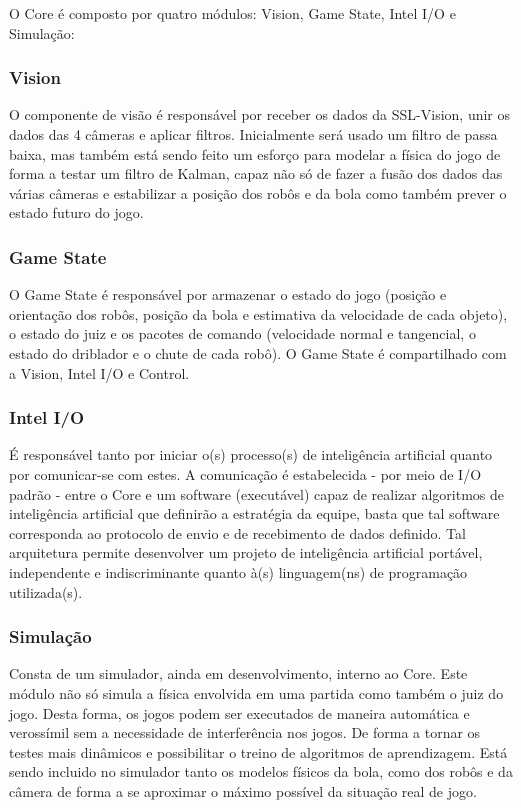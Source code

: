 \documentclass[conference]{IEEEtran}
\begin{document}
O Core é composto por quatro módulos: Vision, Game State, Intel I/O e Simulação:

\subsubsection{Vision}

O componente de visão é responsável por receber os dados da SSL-Vision, unir os dados das 4 câmeras e aplicar filtros. Inicialmente será usado um filtro de passa baixa, mas também está sendo feito um esforço para modelar a física do jogo de forma a testar um filtro de Kalman, capaz não só de fazer a fusão dos dados das várias câmeras e estabilizar a posição dos robôs e da bola como também prever o estado futuro do jogo.

\subsubsection{Game State}

O Game State é responsável por armazenar o estado do jogo (posição e orientação dos robôs, posição da bola e estimativa da velocidade de cada objeto), o estado do juiz e os pacotes de comando (velocidade normal e tangencial, o estado do driblador e o chute de cada robô). O Game State é compartilhado com a Vision, Intel I/O e Control.

\subsubsection{Intel I/O}

É responsável tanto por iniciar o(s) processo(s) de inteligência artificial quanto por comunicar-se com estes. A comunicação é estabelecida - por meio de I/O padrão - entre o Core e um software (executável) capaz de realizar algoritmos de inteligência artificial que definirão a estratégia da equipe, basta que tal software corresponda ao protocolo de envio e de recebimento de dados definido. Tal arquitetura permite desenvolver um projeto de inteligência artificial portável, independente e indiscriminante quanto à(s) linguagem(ns) de programação utilizada(s).

\subsubsection{Simulação}

Consta de um simulador, ainda em desenvolvimento, interno ao Core. Este módulo não só simula a física envolvida em uma partida como também o juiz do jogo. Desta forma, os jogos podem ser executados de maneira automática e verossímil sem a necessidade de interferência nos jogos. De forma a tornar os testes mais dinâmicos e possibilitar o treino de algoritmos de aprendizagem.
Está sendo incluido no simulador tanto os modelos físicos da bola, como dos robôs e da câmera de forma a se aproximar o máximo possível da situação real de jogo.
\end{document}
